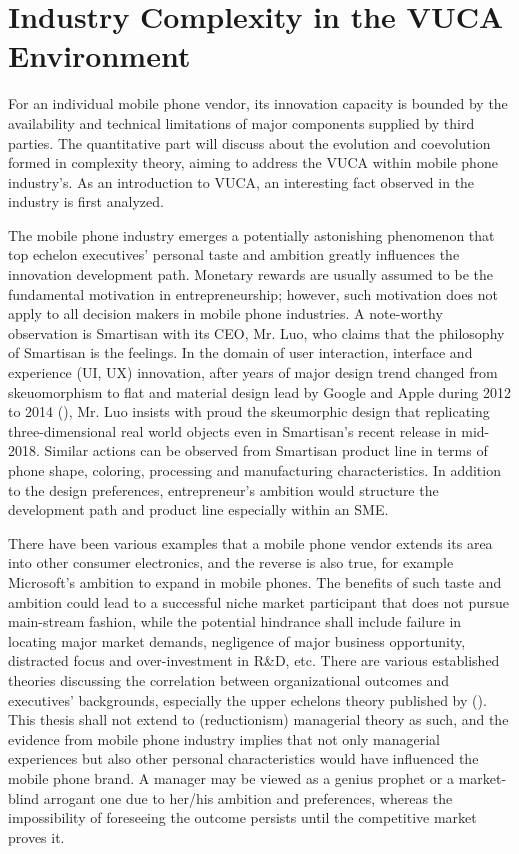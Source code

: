 \documentclass[utf8,english]{gradu3}
\begin{document}
\section{Industry Complexity in the VUCA Environment}

For an individual mobile phone vendor, its innovation capacity is bounded by the availability and technical limitations of major components supplied by third parties. The quantitative part will discuss about the evolution and coevolution formed in complexity theory, aiming to address the VUCA within mobile phone industry's. As an introduction to VUCA, an interesting fact observed in the industry is first analyzed.

The mobile phone industry emerges a potentially astonishing phenomenon that top echelon executives' personal taste and ambition greatly influences the innovation development path. Monetary rewards are usually assumed to be the fundamental motivation in entrepreneurship; however, such motivation does not apply to all decision makers in mobile phone industries. A note-worthy observation is Smartisan with its CEO, Mr. Luo, who claims that the philosophy of Smartisan is the feelings. In the domain of user interaction, interface and experience (UI, UX) innovation, after years of major design trend changed from skeuomorphism to flat and material design lead by Google and Apple during 2012 to 2014 (\cite{burmistrov2015flat}), Mr. Luo insists with proud the skeumorphic design that replicating three-dimensional real world objects even in Smartisan's recent release in mid-2018. Similar actions can be observed from Smartisan product line in terms of phone shape, coloring, processing and manufacturing characteristics. In addition to the design preferences, entrepreneur's ambition would structure the development path and product line especially within an SME. 

There have been various examples that a mobile phone vendor extends its area into other consumer electronics, and the reverse is also true, for example Microsoft's ambition to expand in mobile phones. The benefits of such taste and ambition could lead to a successful niche market participant that does not pursue main-stream fashion, while the potential hindrance shall include failure in locating major market demands, negligence of major business opportunity, distracted focus and over-investment in R\&D, etc. There are various established theories discussing the correlation between organizational outcomes and executives' backgrounds, especially the upper echelons theory published by \citeauthor{hambrick1984upper} (\citeyear{hambrick1984upper}). This thesis shall not extend to (reductionism) managerial theory as such, and the evidence from mobile phone industry implies that not only managerial experiences but also other personal characteristics would have influenced the mobile phone brand. A manager may be viewed as a genius prophet or a market-blind arrogant one due to her/his ambition and preferences, whereas the impossibility of foreseeing the outcome persists until the competitive market proves it.
\end{document}
